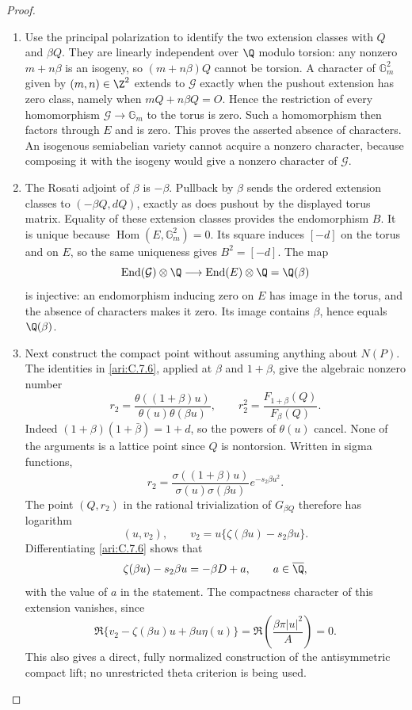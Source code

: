 \begin{proof}
\begin{enumerate}[label=\arabic*.,leftmargin=*]
\item Use the principal polarization to identify the two extension
classes with $Q$ and $\beta Q$. They are linearly independent
over $\Q$ modulo torsion: any nonzero $m+n\beta$ is an
isogeny, so $(m+n\beta)Q$ cannot be torsion. A character
of $\mathbb G_m^2$ given by $(m,n)\in\Z^2$ extends to
$\mathcal G$ exactly when the pushout extension has zero
class, namely when $mQ+n\beta Q=O$. Hence the restriction
of every homomorphism $\mathcal G\to\mathbb G_m$ to
the torus is zero. Such a homomorphism then factors through
$E$ and is zero. This proves the asserted absence of
characters. An isogenous semiabelian variety cannot acquire
a nonzero character, because composing it with the isogeny
would give a nonzero character of $\mathcal G$.

\item The Rosati adjoint of $\beta$ is $-\beta$. Pullback by
$\beta$ sends the ordered extension classes to
$(-\beta Q,dQ)$, exactly as does pushout by the displayed
torus matrix. Equality of these extension classes provides
the endomorphism $B$. It is unique because
$\operatorname{Hom}(E,\mathbb G_m^2)=0$. Its square
induces $[-d]$ on the torus and on $E$, so the same
uniqueness gives $B^2=[-d]$. The map
\[
 \operatorname{End}(\mathcal G)\otimes\Q
     \longrightarrow\operatorname{End}(E)\otimes\Q
          =\Q(\beta)
\]
is injective: an endomorphism inducing zero on $E$ has image
in the torus, and the absence of characters makes it zero.
Its image contains $\beta$, hence equals $\Q(\beta)$.

\item Next construct the compact point without assuming anything
about $N(P)$. The identities in \ref{ari:C.7.6}, applied at $\beta$
and $1+\beta$, give the algebraic nonzero number
\begin{equation}\label{ari:eq:ce-ribet-r}
 r_2=\frac{\theta((1+\beta)u)}{\theta(u)\theta(\beta u)},
 \qquad r_2^2=\frac{F_{1+\beta}(Q)}{F_\beta(Q)}.
\end{equation}
Indeed $(1+\beta)(1+\bar\beta)=1+d$, so the powers
of $\theta(u)$ cancel. None of the arguments is a lattice
point since $Q$ is nontorsion. Written in sigma functions,
\[
 r_2=\frac{\sigma((1+\beta)u)}{\sigma(u)\sigma(\beta u)}
                         e^{-s_2\beta u^2}.
\]
The point $(Q,r_2)$ in the rational trivialization of
$G_{\beta Q}$ therefore has logarithm
\[
 (u,v_2),\qquad
 v_2=u\{\zeta(\beta u)-s_2\beta u\}.
\]
Differentiating \ref{ari:C.7.6} shows that
\begin{equation}\label{ari:eq:ce-zeta}
 \zeta(\beta u)-s_2\beta u=-\beta D+a,
 \qquad a\in\overline\Q,
\end{equation}
with the value of $a$ in the statement. The compactness
character of this extension vanishes, since
\[
 \Re\{v_2-\zeta(\beta u)u+\beta u\eta(u)\}
    =\Re\left(\frac{\beta\pi|u|^2}{A}\right)=0.
\]
This also gives a direct, fully normalized construction of
the antisymmetric compact lift; no unrestricted theta
criterion is being used.


\end{enumerate}
\end{proof}
